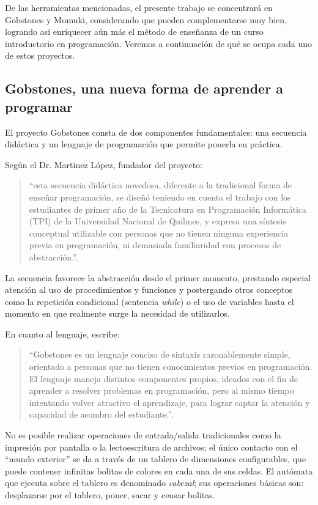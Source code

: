 De las herramientas mencionadas, el presente trabajo se concentrará en Gobstones y Mumuki, considerando que pueden complementarse muy bien, logrando así enriquecer aún más el método de enseñanza de un curso introductorio en programación. Veremos a continuación de qué se ocupa cada uno de estos proyectos.

\subsection{Gobstones, una nueva forma de aprender a programar}
El proyecto Gobstones consta de dos componentes fundamentales: una secuencia didáctica y un lenguaje de programación que permite ponerla en práctica.

Según el Dr. Martínez López, fundador del proyecto:

\begin{quote}
``esta secuencia didáctica novedosa, diferente a la tradicional forma de enseñar programación, se diseñó teniendo en cuenta el trabajo con los estudiantes de primer año de la Tecnicatura en Programación Informática (TPI) de la Universidad Nacional de Quilmes, y expresa una síntesis conceptual utilizable con personas que no tienen ninguna experiencia previa en programación, ni demasiada familiaridad con procesos de abstracción.''\cite{LibroGobstones}.
\end{quote}

La secuencia favorece la abstracción desde el primer momento, prestando especial atención al uso de procedimientos y funciones y postergando otros conceptos como la repetición condicional (sentencia \textit{while}) o el uso de variables hasta el momento en que realmente surge la necesidad de utilizarlos.

En cuanto al lenguaje, escribe:

\begin{quote}
``Gobstones es un lenguaje conciso de sintaxis razonablemente simple, orientado a personas que no tienen conocimientos previos en programación. El lenguaje maneja distintos componentes propios, ideados con el fin de aprender a resolver problemas en programación, pero al mismo tiempo intentando volver atractivo el aprendizaje, para lograr captar la atención y capacidad de asombro del estudiante.''\cite{LibroGobstones}.
\end{quote}

No es posible realizar operaciones de entrada/salida tradicionales como la impresión por pantalla o la lectoescritura de archivos; el único contacto con el ``mundo exterior'' se da a través de un tablero de dimensiones configurables, que puede contener infinitas bolitas de colores en cada una de sus celdas. El autómata que ejecuta sobre el tablero es denominado \textit{cabezal}; sus operaciones básicas son: desplazarse por el tablero, poner, sacar y censar bolitas.

